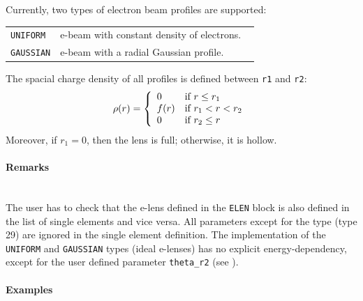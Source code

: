 \noindent Currently, two types of electron beam profiles are supported:

\bigskip
\begin{tabular}{@{}lp{0.8\linewidth}}
    \texttt{UNIFORM}  & e-beam with constant density of electrons. \\
    \texttt{GAUSSIAN} & e-beam with a radial Gaussian profile. \\
\end{tabular}

\bigskip
\noindent The spacial charge density of all profiles is defined between \texttt{r1} and \texttt{r2}:
\begin{equation}
  \rho(r)=\left\{
    \begin{array}{ll}
        0 & \mbox{if $r \le r_1$} \\
        f(r) & \mbox{if $r_1 < r < r_2$} \\
        0 & \mbox{if $r_2 \le r$} \\
    \end{array}
    \right. \\
\end{equation}
Moreover, if $r_1=0$, then the lens is full; otherwise, it is hollow.

\paragraph{Remarks}~\\

The user has to check that the e-lens defined in the \texttt{ELEN} block is also defined in the list of single elements and vice versa.
All parameters except for the type (type 29) are ignored in the single element definition.
The implementation of the \texttt{UNIFORM} and \texttt{GAUSSIAN} types (ideal e-lenses) has no explicit energy-dependency, except for the user defined parameter \texttt{theta\_r2} (see \cite{sixphys}).

\paragraph{Examples}~\\

